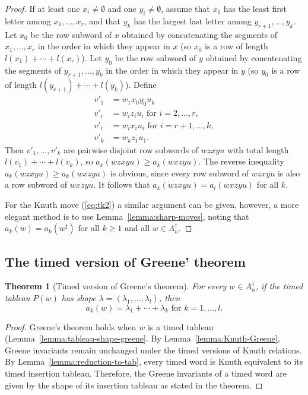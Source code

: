 \documentclass[10pt]{amsproc}
\newtheorem{theorem}{Theorem}[subsection]
\theoremstyle{definition}
\theoremstyle{remark}
\begin{document}
\begin{proof}
  If at least one $x_i\neq \emptyset$ and one $y_i\neq\emptyset$, assume that $x_1$ has the least first letter among $x_1,\dotsc,x_r$, and that $y_k$ has the largest last letter among $y_{r+1},\dotsc,y_k$.
  Let $x_0$ be the row subword of $x$ obtained by concatenating the segments of $x_1,\dotsc,x_r$ in the order in which they appear in $x$ (so $x_0$ is a row of length $l(x_1)+\dotsb + l(x_r)$).
  Let $y_0$ be the row subword of $y$ obtained by concatenating the segments of $y_{r+1},\dotsc, y_k$ in the order in which they appear in $y$ (so $y_0$ is a row of length $l(y_{r+1})+\dotsb + l(y_k)$).
  Define
  \begin{align*}
    v'_1 &= w_1x_0y_0u_k\\
    v'_i &= w_iz_iu_i \text{ for }i=2,\dotsc,r,\\
    v'_i &= w_ix_iu_i \text{ for } i=r+1,\dotsc,k,\\
    v'_k &= w_kz_1u_1.
  \end{align*}
  Then $v'_1,\dotsc,v'_k$ are pairwise disjoint row subwords of $wzxyu$ with total length $l(v_1)+\dotsb+l(v_k)$, so $a_k(wzxyu)\geq a_k(wxzyu)$.
  The reverse inequality $a_k(wzxyu)\geq a_k(wxzyu)$ is obvious, since every row subword of $wzxyu$ is also a row subword of $wxzyu$.
  It follows that $a_k(wzxyu)=a_l(wxzyu)$ for all $k$.

  For the Knuth move (\ref{eq:tk2}) a similar argument can be given, however, a more elegant method is to use Lemma~\ref{lemma:sharp-moves}, noting that $a_k(w)=a_k(w^\sharp)$ for all $k\geq 1$ and all $w\in A_n^\dagger$.
\end{proof}
\subsection{The timed version of Greene' theorem}
\label{sec:timed-version-greene}
\begin{theorem}
  [Timed version of Greene's theorem]
  \label{theorem:timed-version-greene}
  For every $w\in A_n^\dagger$, if the timed tableau $P(w)$ has shape $\lambda=(\lambda_1,\dotsc,\lambda_l)$, then
  \begin{displaymath}
    a_k(w) = \lambda_1+\dotsb+\lambda_k \text{ for $k=1,\dotsc,l$}.
  \end{displaymath}
\end{theorem}
\begin{proof}
  Greene's theorem holds when $w$ is a timed tableau (Lemma~\ref{lemma:tableau-shape-greene}.
  By Lemma~\ref{lemma:Knuth-Greene}, Greene invariants remain unchanged under the timed versions of Knuth relations.
  By Lemma~\ref{lemma:reduction-to-tab}, every timed word is Knuth equivalent to its timed insertion tableau.
  Therefore, the Greene invariants of a timed word are given by the shape of its insertion tableau as stated in the theorem.
\end{proof}
\end{document}

